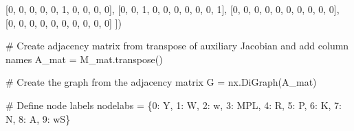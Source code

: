 \documentclass[
  letterpaper,
  DIV=11,
  numbers=noendperiod]{scrreprt}
\newenvironment{Shaded}{\begin{snugshade}}{\end{snugshade}}
\newcommand{\CommentTok}[1]{\textcolor[rgb]{0.37,0.37,0.37}{#1}}
\newcommand{\DecValTok}[1]{\textcolor[rgb]{0.68,0.00,0.00}{#1}}
\newcommand{\NormalTok}[1]{\textcolor[rgb]{0.00,0.23,0.31}{#1}}
\newcommand{\OperatorTok}[1]{\textcolor[rgb]{0.37,0.37,0.37}{#1}}
\newcommand{\StringTok}[1]{\textcolor[rgb]{0.13,0.47,0.30}{#1}}
\begin{document}
\begin{tcolorbox}
\begin{Shaded}
\begin{Highlighting}[]
\NormalTok{    [}\DecValTok{0}\NormalTok{, }\DecValTok{0}\NormalTok{, }\DecValTok{0}\NormalTok{, }\DecValTok{0}\NormalTok{, }\DecValTok{0}\NormalTok{, }\DecValTok{1}\NormalTok{, }\DecValTok{0}\NormalTok{, }\DecValTok{0}\NormalTok{, }\DecValTok{0}\NormalTok{, }\DecValTok{0}\NormalTok{],}
\NormalTok{    [}\DecValTok{0}\NormalTok{, }\DecValTok{0}\NormalTok{, }\DecValTok{1}\NormalTok{, }\DecValTok{0}\NormalTok{, }\DecValTok{0}\NormalTok{, }\DecValTok{0}\NormalTok{, }\DecValTok{0}\NormalTok{, }\DecValTok{0}\NormalTok{, }\DecValTok{0}\NormalTok{, }\DecValTok{1}\NormalTok{],}
\NormalTok{    [}\DecValTok{0}\NormalTok{, }\DecValTok{0}\NormalTok{, }\DecValTok{0}\NormalTok{, }\DecValTok{0}\NormalTok{, }\DecValTok{0}\NormalTok{, }\DecValTok{0}\NormalTok{, }\DecValTok{0}\NormalTok{, }\DecValTok{0}\NormalTok{, }\DecValTok{0}\NormalTok{, }\DecValTok{0}\NormalTok{],}
\NormalTok{    [}\DecValTok{0}\NormalTok{, }\DecValTok{0}\NormalTok{, }\DecValTok{0}\NormalTok{, }\DecValTok{0}\NormalTok{, }\DecValTok{0}\NormalTok{, }\DecValTok{0}\NormalTok{, }\DecValTok{0}\NormalTok{, }\DecValTok{0}\NormalTok{, }\DecValTok{0}\NormalTok{, }\DecValTok{0}\NormalTok{]}
\NormalTok{])}

\CommentTok{\# Create adjacency matrix from transpose of auxiliary Jacobian and add column names}
\NormalTok{A\_mat }\OperatorTok{=}\NormalTok{ M\_mat.transpose()}

\CommentTok{\# Create the graph from the adjacency matrix}
\NormalTok{G }\OperatorTok{=}\NormalTok{ nx.DiGraph(A\_mat)}

\CommentTok{\# Define node labels}
\NormalTok{nodelabs }\OperatorTok{=}\NormalTok{ \{}\DecValTok{0}\NormalTok{: }\StringTok{\textquotesingle{}Y\textquotesingle{}}\NormalTok{, }\DecValTok{1}\NormalTok{: }\StringTok{\textquotesingle{}W\textquotesingle{}}\NormalTok{, }\DecValTok{2}\NormalTok{: }\StringTok{\textquotesingle{}w\textquotesingle{}}\NormalTok{, }\DecValTok{3}\NormalTok{: }\StringTok{\textquotesingle{}MPL\textquotesingle{}}\NormalTok{, }\DecValTok{4}\NormalTok{: }\StringTok{\textquotesingle{}R\textquotesingle{}}\NormalTok{, }\DecValTok{5}\NormalTok{: }\StringTok{\textquotesingle{}P\textquotesingle{}}\NormalTok{, }\DecValTok{6}\NormalTok{: }\StringTok{\textquotesingle{}K\textquotesingle{}}\NormalTok{, }\DecValTok{7}\NormalTok{: }\StringTok{\textquotesingle{}N\textquotesingle{}}\NormalTok{, }\DecValTok{8}\NormalTok{: }\StringTok{\textquotesingle{}A\textquotesingle{}}\NormalTok{, }\DecValTok{9}\NormalTok{: }\StringTok{\textquotesingle{}wS\textquotesingle{}}\NormalTok{\}}


\end{Highlighting}
\end{Shaded}
\end{tcolorbox}
\end{document}
